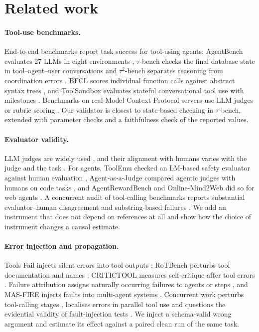 \documentclass[pdflatex,sn-mathphys-num,Numbered]{sn-jnl}
\begin{document}
\section{Related work}\label{sec:related}

\paragraph{Tool-use benchmarks.} End-to-end benchmarks report task success for tool-using agents: AgentBench evaluates 27 LLMs in eight environments \cite{liu2024agentbench}, $\tau$-bench checks the final database state in tool--agent--user conversations \cite{yao2025taubench} and $\tau^2$-bench separates reasoning from coordination errors \cite{barres2025tau2}. BFCL scores individual function calls against abstract syntax trees \cite{patil2025bfcl}, and ToolSandbox evaluates stateful conversational tool use with milestones \cite{lu2025toolsandbox}. Benchmarks on real Model Context Protocol servers use LLM judges or rubric scoring \cite{wang2025mcpbench,mo2026livemcpbench}. Our validator is closest to state-based checking in $\tau$-bench, extended with parameter checks and a faithfulness check of the reported values.

\paragraph{Evaluator validity.} LLM judges are widely used \cite{zheng2023judging,gu2024surveyjudge}, and their alignment with humans varies with the judge and the task \cite{thakur2025judging}. For agents, ToolEmu checked an LM-based safety evaluator against human evaluation \cite{ruan2024toolemu}, Agent-as-a-Judge compared agentic judges with humans on code tasks \cite{zhuge2025agentasajudge}, and AgentRewardBench and Online-Mind2Web did so for web agents \cite{lu2025agentrewardbench,xue2025illusion}. A concurrent audit of tool-calling benchmarks reports substantial evaluator--human disagreement and substring-based failures \cite{bhat2026benchmarkingbenchmarks}. We add an instrument that does not depend on references at all and show how the choice of instrument changes a causal estimate.

\paragraph{Error injection and propagation.} Tools Fail injects silent errors into tool outputs \cite{sun2024toolsfail}; RoTBench perturbs tool documentation and names \cite{ye2024rotbench}; CRITICTOOL measures self-critique after tool errors \cite{huang2025critictool}. Failure attribution assigns naturally occurring failures to agents or steps \cite{zhang2025whowhen,zhu2025whereagentsfail,liu2026agenthallu}, and MAS-FIRE injects faults into multi-agent systems \cite{jia2026masfire}. Concurrent work perturbs tool-calling stages \cite{zheng2026toolrobustbench}, localises errors in parallel tool use \cite{guan2026pararecover} and questions the evidential validity of fault-injection tests \cite{he2026sscbench}. We inject a schema-valid wrong argument and estimate its effect against a paired clean run of the same task.
\end{document}
